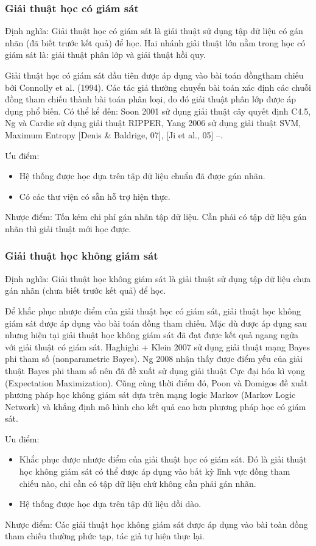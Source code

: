 \documentclass[12pt]{extarticle}
\begin{document}
				\subsubsection*{Giải thuật học có giám sát}
					\par Định nghĩa: Giải thuật học có giám sát là giải thuật sử dụng tập dữ liệu có gán nhãn (đã biết trước kết quả) để học. Hai nhánh giải thuật lớn nằm trong học có giám sát là: giải thuật phân lớp và giải thuật hồi quy.
					\par Giải thuật học có giám sát đầu tiên được áp dụng vào bài toán đồngtham chiếu bởi Connolly et al. (1994). Các tác giả thường chuyển bài toán xác định các chuỗi đồng tham chiếu thành bài toán phân loại, do đó giải thuật phân lớp được áp dụng phổ biến. Có thể kể đến: Soon 2001 sử dụng giải thuật cây quyết định C4.5, Ng và Cardie sử dụng giải thuật RIPPER, Yang 2006 sử dụng giải thuật SVM, Maximum Entropy [Denis \& Baldrige, 07], [Ji et al., 05] –.
					\par Ưu điểm:
					\begin{itemize}
						\item{Hệ thống được học dựa trên tập dữ liệu chuẩn đã được gán nhãn.}
						\item{Có các thư viện có sẵn hỗ trợ hiện thực.}
					\end{itemize}
					\par Nhược điểm: Tốn kém chi phí gán nhãn tập dữ liệu. Cần phải có tập dữ liệu gán nhãn thì giải thuật mới học được. 
				\subsubsection*{Giải thuật học không giám sát}
					\par Định nghĩa: Giải thuật học không giám sát là giải thuật sử dụng tập dữ liệu chưa gán nhãn (chưa biết trước kết quả) để học.
					\par Để khắc phục nhược điểm của giải thuật học có giám sát, giải thuật học không giám sát được áp dụng vào bài toán đồng tham chiếu. Mặc dù được áp dụng sau nhưng hiện tại giải thuật học không giám sát đã đạt được kết quả ngang ngửa với giải thuật có giám sát. Haghighi + Klein 2007 sử dụng giải thuật mạng Bayes phi tham số (nonparametric Bayes). Ng 2008 nhận thấy được điểm yếu của giải thuật Bayes phi tham số nên đã đề xuất sử dụng giải thuật Cực đại hóa kì vọng (Expectation Maximization). Cũng cùng thời điểm đó, Poon và Domigos đề xuất phương pháp học không giám sát dựa trên mạng logic Markov (Markov Logic Network) và khẳng định mô hình cho kết quả cao hơn phương pháp học có giám sát.
					\par Ưu điểm:
					\begin{itemize}
						\item{Khắc phục được nhược điểm của giải thuật học có giám sát. Đó là giải thuật học không giám sát có thể được áp dụng vào bất kỳ lĩnh vực đồng tham chiếu nào, chỉ cần có tập dữ liệu chứ không cần phải gán nhãn.}
						\item{Hệ thống được học dựa trên tập dữ liệu dồi dào.}
					\end{itemize}
					\par Nhược điểm: Các giải thuật học không giám sát được áp dụng vào bài toàn đồng tham chiếu thường phức tạp, tác giả tự hiện thực lại.
\end{document}
